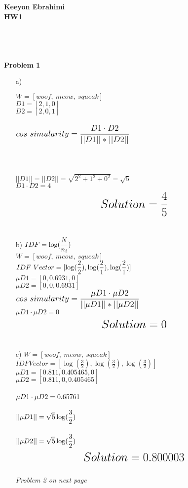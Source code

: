 \documentclass[ruled]{article}
\begin{document}
\textbf{Keeyon Ebrahimi}\\
\textbf{HW1}\\ \\ \\ \\ \\
\textbf{Problem 1}
\begin{itemize}
\item[a) ]

$W = [woof,\ meow,\ squeak]$ \\
$D1 = [2, 1, 0] $ \\
$D2 = [2, 0, 1]$\\ \\
$\mathlarger{\mathlarger{cos\ simularity = \frac{D1 \cdot D2}{||D1|| * ||D2||}}}$
\\ \\ \\ \\
$||D1|| = ||D2|| = \sqrt{2^2 + 1^2 + 0^2} = \sqrt{5}$\\
$D1 \cdot D2 = 4$\\
$$\mathlarger{\mathlarger{\mathlarger{Solution = \frac{4}{5}}}}$$\\
\item[b) ]
$IDF = \mathlarger{\log (\frac{N}{n_i}})$\\
$W = [woof,\ meow,\ squeak]$ \\
$IDF\ Vector = [ \mathlarger{\log (\frac{2}{2}), \log (\frac{2}{1}), \log (\frac{2}{1}) ]}$\\
$\mu D1 = [0, 0.6931, 0] $\\
$\mu D2 = [0, 0, 0.6931]$ \\
$\mathlarger{\mathlarger{cos\ simularity = \frac{\mu D1 \cdot \mu D2}{||\mu D1|| * ||\mu D2||}}}$\\
$\mu D1 \cdot \mu D2 = 0$\\
$$\mathlarger{\mathlarger{\mathlarger{Solution = 0}}}$$\\
\item[c) ]
$W = [woof,\ meow,\ squeak]$ \\
$IDF Vector = [\log (\frac{3}{2}), \log (\frac{3}{2}), \log (\frac{3}{2})]$\\
$\mu D1 = [0.811, 0.405465, 0]$\\
$\mu D2 = [0.811, 0, 0.405465]$\\ \\
$\mathlarger{ \mu D1 \cdot \mu D2 = 0.65761}$\\ \\
$\mathlarger{ ||\mu D1|| = \sqrt{5} \log( \frac{3}{2})}$\\\\
$\mathlarger{ ||\mu D2|| = \sqrt{5} \log( \frac{3}{2})}$\\
$$\mathlarger{\mathlarger{\mathlarger{Solution = 0.800003}}}$$\\
\textit{Problem 2 on next page}
\end{itemize}
\end{document}
